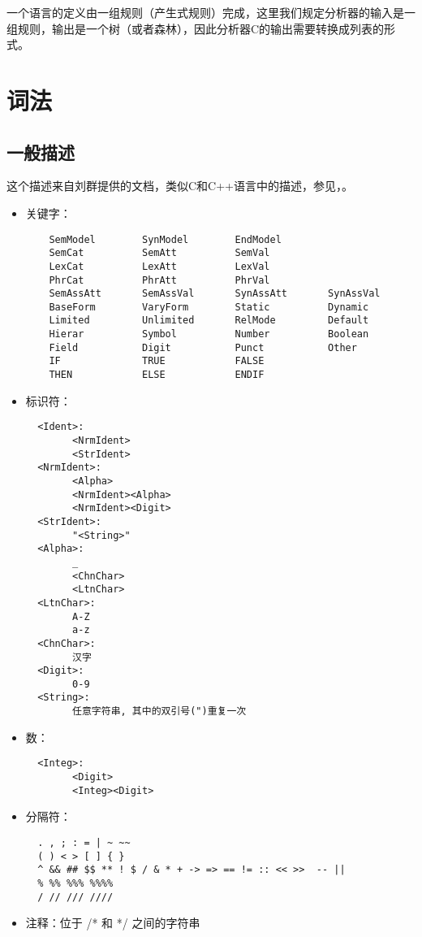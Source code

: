 \documentclass{article}
\begin{document}
\begin{CJK}{UTF8}{gbsn}
一个语言的定义由一组规则（产生式规则）完成，这里我们规定分析器的输入是一组规则，输出是一个树（或者森林），因此分析器C的输出需要转换成列表的形式。

\section{词法}

\subsection{一般描述} \label{sec:lexspec}

这个描述来自刘群提供的文档，类似C和C++语言中的描述，参见\cite{KandR1988}，\cite{Stroustrup2000}。

\begin{itemize}
\item 关键字：
\begin{verbatim}
    SemModel        SynModel        EndModel
    SemCat          SemAtt          SemVal
    LexCat          LexAtt          LexVal
    PhrCat          PhrAtt          PhrVal
    SemAssAtt       SemAssVal       SynAssAtt       SynAssVal
    BaseForm        VaryForm        Static          Dynamic
    Limited         Unlimited       RelMode         Default
    Hierar          Symbol          Number          Boolean
    Field           Digit           Punct           Other
    IF              TRUE            FALSE
    THEN            ELSE            ENDIF
\end{verbatim}
\item 标识符：
\begin{verbatim}
  <Ident>:
        <NrmIdent>
        <StrIdent>
  <NrmIdent>:
        <Alpha>
        <NrmIdent><Alpha>
        <NrmIdent><Digit>
  <StrIdent>:
        "<String>"
  <Alpha>:
        _
        <ChnChar>
        <LtnChar>
  <LtnChar>:
        A-Z
        a-z
  <ChnChar>:
        汉字
  <Digit>:
        0-9
  <String>:
        任意字符串, 其中的双引号(")重复一次
\end{verbatim}
\item 数：
\begin{verbatim}
  <Integ>:
        <Digit>
        <Integ><Digit>
\end{verbatim}
\item 分隔符：
\begin{verbatim}
  . , ; : = | ~ ~~
  ( ) < > [ ] { }
  ^ && ## $$ ** ! $ / & * + -> => == != :: << >>  -- ||
  % %% %%% %%%%
  / // /// ////
\end{verbatim}
\item 注释：位于 /* 和 */ 之间的字符串
\end{itemize}


\end{CJK}
\end{document}
